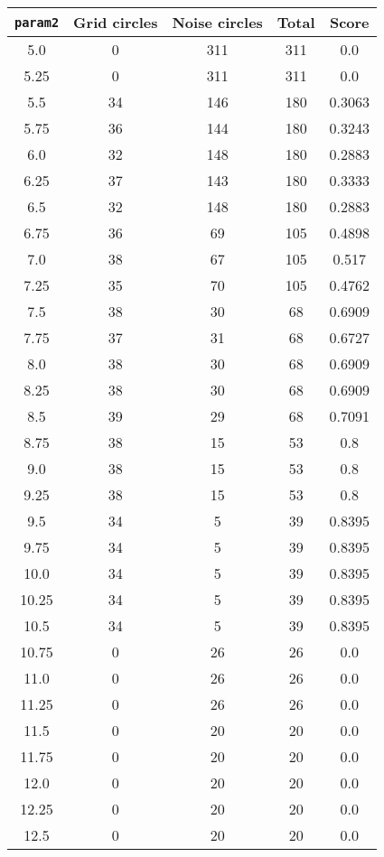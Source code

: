 \documentclass[letterpaper, 12pt]{article}
\begin{document}
\begin{longtable}{|c|c|c|c|c|}
\hline
\textbf{\texttt{param2}} & \textbf{Grid circles} & \textbf{Noise circles} & \textbf{Total} & \textbf{Score} \\
\hline
5.0 & 0 & 311 & 311 & 0.0 \\
\hline
5.25 & 0 & 311 & 311 & 0.0 \\
\hline
5.5 & 34 & 146 & 180 & 0.3063 \\
\hline
5.75 & 36 & 144 & 180 & 0.3243 \\
\hline
6.0 & 32 & 148 & 180 & 0.2883 \\
\hline
6.25 & 37 & 143 & 180 & 0.3333 \\
\hline
6.5 & 32 & 148 & 180 & 0.2883 \\
\hline
6.75 & 36 & 69 & 105 & 0.4898 \\
\hline
7.0 & 38 & 67 & 105 & 0.517 \\
\hline
7.25 & 35 & 70 & 105 & 0.4762 \\
\hline
7.5 & 38 & 30 & 68 & 0.6909 \\
\hline
7.75 & 37 & 31 & 68 & 0.6727 \\
\hline
8.0 & 38 & 30 & 68 & 0.6909 \\
\hline
8.25 & 38 & 30 & 68 & 0.6909 \\
\hline
8.5 & 39 & 29 & 68 & 0.7091 \\
\hline
8.75 & 38 & 15 & 53 & 0.8 \\
\hline
9.0 & 38 & 15 & 53 & 0.8 \\
\hline
9.25 & 38 & 15 & 53 & 0.8 \\
\hline
9.5 & 34 & 5 & 39 & 0.8395 \\
\hline
9.75 & 34 & 5 & 39 & 0.8395 \\
\hline
10.0 & 34 & 5 & 39 & 0.8395 \\
\hline
10.25 & 34 & 5 & 39 & 0.8395 \\
\hline
10.5 & 34 & 5 & 39 & 0.8395 \\
\hline
10.75 & 0 & 26 & 26 & 0.0 \\
\hline
11.0 & 0 & 26 & 26 & 0.0 \\
\hline
11.25 & 0 & 26 & 26 & 0.0 \\
\hline
11.5 & 0 & 20 & 20 & 0.0 \\
\hline
11.75 & 0 & 20 & 20 & 0.0 \\
\hline
12.0 & 0 & 20 & 20 & 0.0 \\
\hline
12.25 & 0 & 20 & 20 & 0.0 \\
\hline
12.5 & 0 & 20 & 20 & 0.0 \\

\end{longtable}
\end{document}

